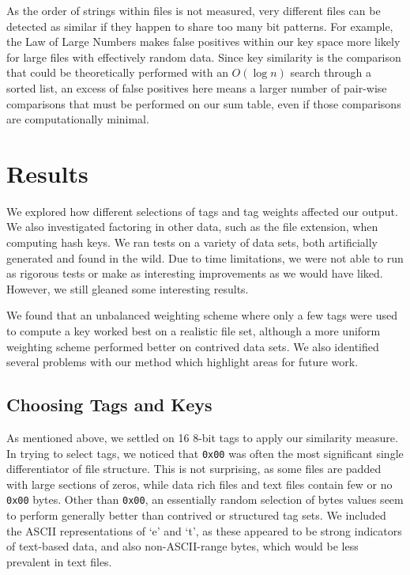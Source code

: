 \documentclass[10pt, twocolumn]{article}
\begin{document}
As the order of strings within files is not measured, very different files can be detected as similar if they happen to share too many bit patterns.  For example, the Law of Large Numbers makes false positives within our key space more likely for large files with effectively random data.  Since key similarity is the comparison that could be theoretically performed with an $O(\log n)$ search through a sorted list, an excess of false positives here means a larger number of pair-wise comparisons that must be performed on our sum table, even if those comparisons are computationally minimal.

\section{Results}

We explored how different selections of tags and tag weights affected our output. We also investigated factoring in other data, such as the file extension, when computing hash keys.  We ran tests on a variety of data sets, both artificially generated and found in the wild. Due to time limitations, we were not able to run as rigorous tests or make as interesting improvements as we would have liked. However, we still gleaned some interesting results.

We found that an unbalanced weighting scheme where only a few tags were used to compute a key worked best on a realistic file set, although a more uniform weighting scheme performed better on contrived data sets. We also identified several problems with our method which highlight areas for future work.

\subsection{Choosing Tags and Keys}

As mentioned above, we settled on 16 8-bit tags to apply our similarity measure.  In trying to select tags, we noticed that {\tt 0x00} was often the most significant single differentiator of file structure.  This is not surprising, as some files are padded with large sections of zeros, while data rich files and text files contain few or no {\tt 0x00} bytes.  Other than {\tt 0x00}, an essentially random selection of bytes values seem to perform generally better than contrived or structured tag sets.  We included the ASCII representations of `e' and `t', as these appeared to be strong indicators of text-based data, and also non-ASCII-range bytes, which would be less prevalent in text files.
\end{document}

